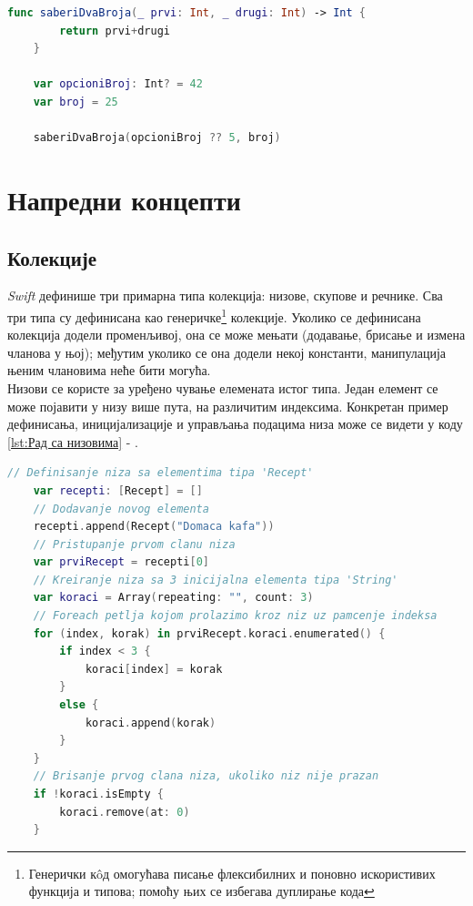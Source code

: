 \documentclass[12pt,oneside]{memoir}
\begin{document}
\begin{lstlisting}[caption=\textit{{Одмотавање опционе променљиве задавањем подразумеване вредности}}, label={lst:Одмотавање опционе променљиве задавањем подразумеване вредности}, language=Swift, frame=single]
    func saberiDvaBroja(_ prvi: Int, _ drugi: Int) -> Int {
        return prvi+drugi
    }
    
    var opcioniBroj: Int? = 42
    var broj = 25
    
    saberiDvaBroja(opcioniBroj ?? 5, broj)
\end{lstlisting}

\section{Напредни концепти}

\subsection{Колекције}
\label{subsec:Колекције}

\indent \textit{Swift} дефинише три примарна типа колекција: низове, скупове и речнике. Сва три типа су дефинисана као генеричке\footnote{Генерички к\^{o}д омогућава писање флексибилних и поновно искористивих функција и типова; помоћу њих се избегава дуплирање кода} колекције. Уколико се дефинисана колекција додели променљивој, она се може мењати (додавање, брисање и измена чланова у њој); међутим уколико се она додели некој константи, манипулација њеним члановима неће бити могућа. \\
\indent Низови се користе за уређено чување елемената истог типа. Један елемент се може појавити у низу више пута, на различитим индексима. Конкретан пример дефинисања, иницијализације и управљања подацима низа може се видети у коду \ref{lst:Рад са низовима} - .

\begin{lstlisting}[caption=\textit{{Рад са низовима}}, label={lst:Рад са низовима}, language=Swift, frame=single]
    // Definisanje niza sa elementima tipa 'Recept'
    var recepti: [Recept] = []
    // Dodavanje novog elementa
    recepti.append(Recept("Domaca kafa"))
    // Pristupanje prvom clanu niza
    var prviRecept = recepti[0]
    // Kreiranje niza sa 3 inicijalna elementa tipa 'String'
    var koraci = Array(repeating: "", count: 3)
    // Foreach petlja kojom prolazimo kroz niz uz pamcenje indeksa
    for (index, korak) in prviRecept.koraci.enumerated() {
        if index < 3 {
            koraci[index] = korak
        }
        else {
            koraci.append(korak)
        }
    }
    // Brisanje prvog clana niza, ukoliko niz nije prazan
    if !koraci.isEmpty {
        koraci.remove(at: 0)
    }
\end{lstlisting}
\end{document}
